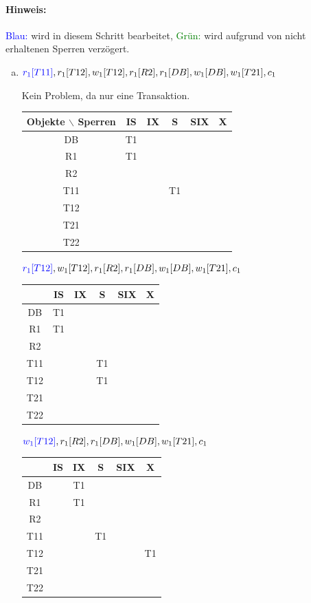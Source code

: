 \begin{note}
	\paragraph{\color{notecolor}Hinweis:} \textcolor{blue}{Blau:} wird in diesem Schritt bearbeitet, \textcolor{green}{Grün:} wird aufgrund von nicht erhaltenen Sperren verzögert.

	\begin{enumerate}[a)]
		\item $\textcolor{blue}{r_1[T11]}, r_1[T12], w_1[T12], r_1[R2], r_1[DB], w_1[DB], w_1[T21], c_1$

		Kein Problem, da nur eine Transaktion.

		\begin{tabular}{|c|c|c|c|c|c|}
			\hline
			Objekte $\backslash$ Sperren & IS & IX & S & SIX & X \\
			\hline
			DB & T1 &  &  &  &  \\
			\hline
			R1 & T1 &  &  &  &  \\
			\hline
			R2 &  &  &  &  &  \\
			\hline
			T11 &  &  & T1 &  &  \\
			\hline
			T12 &  &  &  &  &  \\
			\hline
			T21 &  &  &  &  &  \\
			\hline
			T22 &  &  &  &  &  \\
			\hline
		\end{tabular}

	$\textcolor{blue}{r_1[T12]}, w_1[T12], r_1[R2], r_1[DB], w_1[DB], w_1[T21], c_1$

	\begin{tabular}{|c|c|c|c|c|c|}
		\hline
		 & IS & IX & S & SIX & X \\
		\hline
		DB & T1 &  &  &  &  \\
		\hline
		R1 & T1 &  &  &  &  \\
		\hline
		R2 &  &  &  &  &  \\
		\hline
		T11 &  &  & T1 &  &  \\
		\hline
		T12 &  &  & T1 &  &  \\
		\hline
		T21 &  &  &  &  &  \\
		\hline
		T22 &  &  &  &  &  \\
		\hline
	\end{tabular}

	$\textcolor{blue}{w_1[T12]}, r_1[R2], r_1[DB], w_1[DB], w_1[T21], c_1$

		\begin{tabular}{|c|c|c|c|c|c|}
		\hline
		& IS & IX & S & SIX & X \\
		\hline
		DB &  & T1 &  &  &  \\
		\hline
		R1 &  & T1 &  &  &  \\
		\hline
		R2 &  &  &  &  &  \\
		\hline
		T11 &  &  & T1 &  &  \\
		\hline
		T12 &  &  &  &  & T1 \\
		\hline
		T21 &  &  &  &  &  \\
		\hline
		T22 &  &  &  &  &  \\
		\hline
	\end{tabular}


\end{enumerate}
\end{note}
